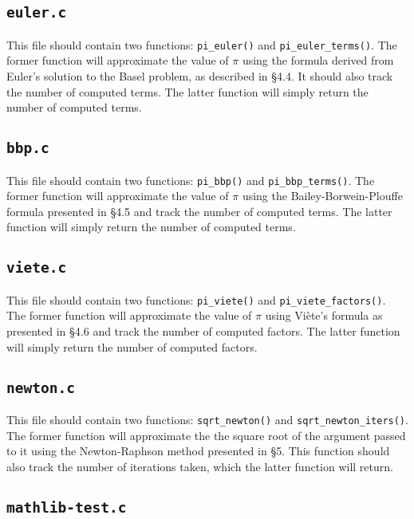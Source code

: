 \subsection{\texttt{euler.c}}

This file should contain two functions: \texttt{pi\_euler()} and
\texttt{pi\_euler\_terms()}. The former function will approximate the
value of $\pi$ using the formula derived from Euler's solution to the
Basel problem, as described in \S4.4. It should also track the number of
computed terms. The latter function will simply return the number of
computed terms.

\subsection{\texttt{bbp.c}}

This file should contain two functions: \texttt{pi\_bbp()} and
\texttt{pi\_bbp\_terms()}. The former function will approximate the value
of $\pi$ using the Bailey-Borwein-Plouffe formula presented in \S4.5 and
track the number of computed terms. The latter function will simply
return the number of computed terms.

\subsection{\texttt{viete.c}}

This file should contain two functions: \texttt{pi\_viete()} and
\texttt{pi\_viete\_factors()}. The former function will approximate the
value of $\pi$ using Vi\`{e}te's formula as presented in \S4.6 and track
the number of computed factors. The latter function will simply return
the number of computed factors.

\subsection{\texttt{newton.c}}

This file should contain two functions: \texttt{sqrt\_newton()} and
\texttt{sqrt\_newton\_iters()}. The former function will approximate the
the square root of the argument passed to it using the Newton-Raphson
method presented in \S5. This function should also track the number of
iterations taken, which the latter function will return.

\subsection{\texttt{mathlib-test.c}}

